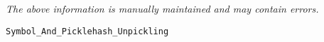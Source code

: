 \label{pkg:symbol\_and\_picklehash\_unpickling}

{\tiny \it The above information is manually maintained and may contain errors.}
\begin{verbatim}
Symbol_And_Picklehash_Unpickling
\end{verbatim}
